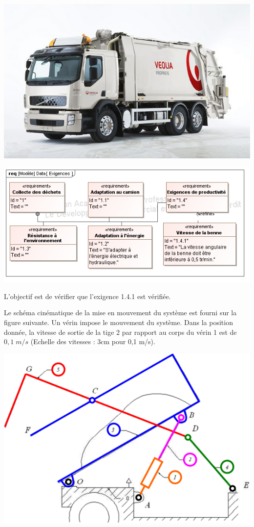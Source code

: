 \documentclass[10pt]{article}
\begin{document}
\begin{minipage}[c]{.3\linewidth}
\begin{center}
\includegraphics[width=.95\textwidth]{images/fig3_1}\hfill
\end{center}
\end{minipage} \hfill
\begin{minipage}[c]{.65\linewidth}
\begin{center}
\includegraphics[width=.95\textwidth]{images/SysML/Exigences_Benne}
\end{center}
\end{minipage}

\begin{Objectif}
L'objectif est de vérifier que l'exigence 1.4.1 est vérifiée.
\end{Objectif}


Le schéma cinématique de la mise en mouvement du système est fourni sur la figure suivante. Un vérin impose le mouvement du système. Dans la position donnée, la vitesse de sortie de la tige 2 par rapport au corps du vérin 1 est de $0,1\; m/s$ (Echelle des vitesses : 3cm pour 0,1 m/s).


\begin{center}
\includegraphics[width=.6\textwidth]{images/fig4}
\end{center}
\end{document}
